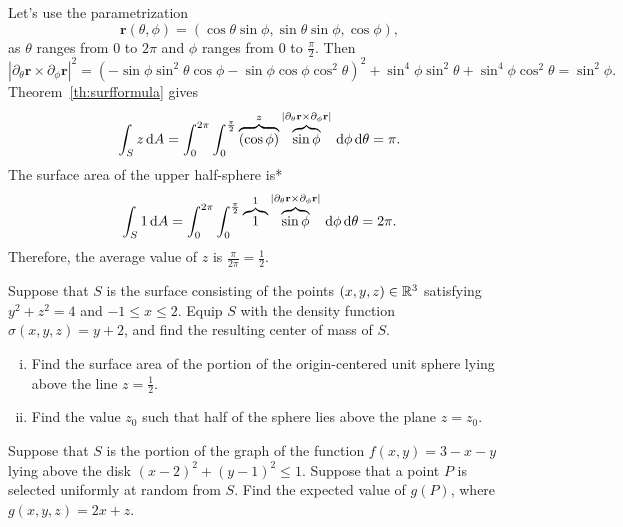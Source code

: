 \documentclass[prettycode,shellescape]{watsonbook}
\begin{document}
\begin{solution}
  Let's use the parametrization 
  \[
    \mathbf{r}(\theta,\phi) =
    (\cos\theta\sin\phi,\sin\theta\sin\phi,\cos\phi), 
  \]
  as $\theta$ ranges from 0 to $2\pi$ and $\phi$ ranges from $0$ to
  $\frac{\pi}{2}$. Then 
  \[
    |\partial_\theta\mathbf{r} \times     \partial_\phi\mathbf{r} |^2=
    \left(- \sin{\phi} \sin^{2}{\theta
      } \cos{\phi} - \sin{\phi}
      \cos{\phi} \cos^{2}{\theta}\right)^{2} + \sin^{4}{\phi} \sin^{2}{\theta } + \sin^{4}{\phi}
    \cos^{2}{\theta } = \sin^2\phi. 
  \]
  Theorem~\ref{th:surfformula} gives 
  \[
    \int_S z \, \mathrm{d}{A} = \int_{0}^{2\pi} \int_{0}^{\frac{\pi}{2}}
    \overbrace{(\cos\phi)}^{z} \overbrace{\sin\phi}^{|\partial_\theta
      \mathbf{r}\times \partial_\phi \mathbf{r}|} \, \mathrm{d} \phi \, \mathrm{d}
    \theta = \pi. 
  \]
  The surface area of the upper half-sphere is* 
  \[
    \int_S 1 \, \mathrm{d}{A} = \int_{0}^{2\pi} \int_{0}^{\frac{\pi}{2}}
    \overbrace{1}^{1} \overbrace{\sin\phi}^{|\partial_\theta
      \mathbf{r}\times \partial_\phi \mathbf{r}|} \, \mathrm{d} \phi \, \mathrm{d}
    \theta = 2\pi. 
  \]
  Therefore, the average value of $z$ is
  $\displaystyle{\frac{\pi}{2\pi}} = \boxed{\frac{1}{2}}$. 
\end{solution}

\begin{exercise}{}{}
  Suppose that $S$ is the surface consisting of the points
  $(x,y,z) \in \mathbb{R}^3$ satisfying $y^2 + z^2 = 4$ and
  $-1 \leq x \leq 2$. Equip $S$ with the density function
  $\sigma(x,y,z) = y + 2$, and find the resulting center of mass of
  $S$.
\end{exercise}

\begin{exercise}{}{}
  \begin{enumerate}[(i),leftmargin=12pt]
  \item Find the surface area of the portion of the origin-centered
    unit sphere lying above the line $z = \frac{1}{2}$.
  \item Find the value $z_0$ such that half of the sphere lies above the
    plane $z = z_0$. 
  \end{enumerate}
\end{exercise}

\begin{exercise}{}{}
  Suppose that $S$ is the portion of the graph of the function
  $f(x,y) = 3 - x - y$ lying above the disk
  $(x-2)^2 + (y-1)^2 \leq 1$. Suppose that a point $P$ is selected
  uniformly at random from $S$. Find the expected value of $g(P)$,
  where $g(x,y,z) = 2x + z$. 
\end{exercise}
\end{document}
